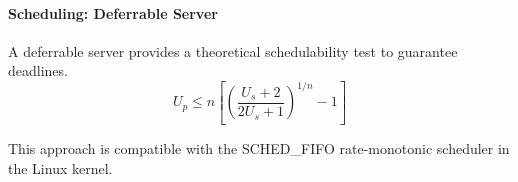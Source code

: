 \documentclass[11pt,a4paper]{article}
\begin{document}
\paragraph{Scheduling: Deferrable Server}
A deferrable server provides a theoretical schedulability test to guarantee deadlines.
\begin{equation*}
    U_p \leq n \left[\left(\frac{U_s + 2}{2U_s + 1}\right)^{1/n} - 1\right]
\end{equation*}

This approach is compatible with the SCHED\_FIFO rate-monotonic scheduler in the Linux kernel.

\clearpage
{}


\end{document}
